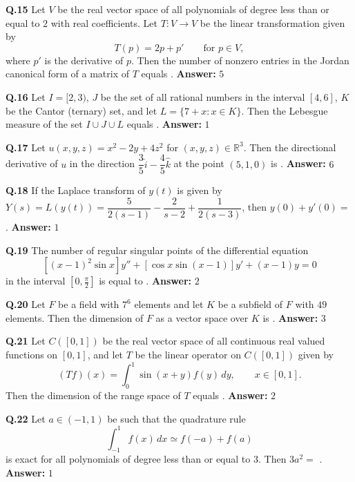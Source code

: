 \documentclass[11pt,a4paper]{article}
\newcommand{\ans}[1]{\textbf{Answer:} #1\par\medskip}
\begin{document}
\textbf{Q.15} Let $V$ be the real vector space of all polynomials of degree less than or equal to $2$ with real coefficients. Let $T : V \to V$ be the linear transformation given by
\[
  T(p) = 2p + p' \qquad \text{for } p \in V,
\]
where $p'$ is the derivative of $p$. Then the number of nonzero entries in the Jordan canonical form of a matrix of $T$ equals \underline{\hspace{2cm}}.
\ans{$5$}

\textbf{Q.16} Let $I = [2, 3)$, $J$ be the set of all rational numbers in the interval $[4, 6]$, $K$ be the Cantor (ternary) set, and let $L = \{7 + x : x \in K\}$. Then the Lebesgue measure of the set $I \cup J \cup L$ equals \underline{\hspace{2cm}}.
\ans{$1$}

\textbf{Q.17} Let $u(x, y, z) = x^2 - 2y + 4z^2$ for $(x, y, z) \in \mathbb{R}^3$. Then the directional derivative of $u$ in the direction $\dfrac{3}{5}\hat{i} - \dfrac{4}{5}\hat{k}$ at the point $(5, 1, 0)$ is \underline{\hspace{2cm}}.
\ans{$6$}

\textbf{Q.18} If the Laplace transform of $y(t)$ is given by $Y(s) = L(y(t)) = \dfrac{5}{2(s - 1)} - \dfrac{2}{s - 2} + \dfrac{1}{2(s - 3)}$, then $y(0) + y'(0) =$ \underline{\hspace{2cm}}.
\ans{$1$}

\textbf{Q.19} The number of regular singular points of the differential equation
\[
  \left[(x - 1)^2 \sin x\right] y'' + \left[\cos x \sin(x - 1)\right] y' + (x - 1) y = 0
\]
in the interval $\left[0, \frac{\pi}{2}\right]$ is equal to \underline{\hspace{2cm}}.
\ans{$2$}

\textbf{Q.20} Let $F$ be a field with $7^6$ elements and let $K$ be a subfield of $F$ with $49$ elements. Then the dimension of $F$ as a vector space over $K$ is \underline{\hspace{2cm}}.
\ans{$3$}

\textbf{Q.21} Let $C([0, 1])$ be the real vector space of all continuous real valued functions on $[0, 1]$, and let $T$ be the linear operator on $C([0, 1])$ given by
\[
  (Tf)(x) = \int_0^1 \sin(x + y) f(y)\,dy, \qquad x \in [0, 1].
\]
Then the dimension of the range space of $T$ equals \underline{\hspace{2cm}}.
\ans{$2$}

\textbf{Q.22} Let $a \in (-1, 1)$ be such that the quadrature rule
\[
  \int_{-1}^{1} f(x)\,dx \simeq f(-a) + f(a)
\]
is exact for all polynomials of degree less than or equal to $3$. Then $3a^2 =$ \underline{\hspace{2cm}}.
\ans{$1$}
\end{document}
